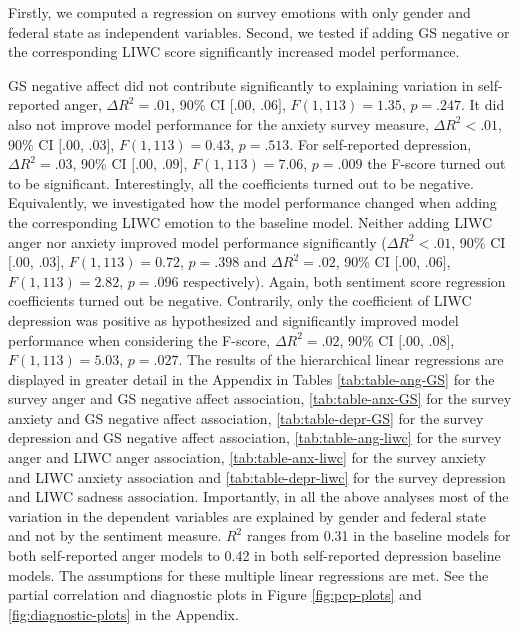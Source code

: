 \documentclass[
  english,
  jou,floatsintext]{apa7}
\begin{document}
Firstly, we computed a regression on survey emotions with only gender and federal state as independent variables. Second, we tested if adding GS negative or the corresponding LIWC score significantly increased model performance.

GS negative affect did not contribute significantly to explaining variation in self-reported anger, \(\Delta R^2 = .01\), 90\% CI \([.00\), \(.06]\), \(F(1, 113) = 1.35\), \(p = .247\). It did also not improve model performance for the anxiety survey measure, \(\Delta R^2 < .01\), 90\% CI \([.00\), \(.03]\), \(F(1, 113) = 0.43\), \(p = .513\). For self-reported depression, \(\Delta R^2 = .03\), 90\% CI \([.00\), \(.09]\), \(F(1, 113) = 7.06\), \(p = .009\) the F-score turned out to be significant. Interestingly, all the coefficients turned out to be negative.
Equivalently, we investigated how the model performance changed when adding the corresponding LIWC emotion to the baseline model. Neither adding LIWC anger nor anxiety improved model performance significantly (\(\Delta R^2 < .01\), 90\% CI \([.00\), \(.03]\), \(F(1, 113) = 0.72\), \(p = .398\) and \(\Delta R^2 = .02\), 90\% CI \([.00\), \(.06]\), \(F(1, 113) = 2.82\), \(p = .096\) respectively). Again, both sentiment score regression coefficients turned out be negative. Contrarily, only the coefficient of LIWC depression was positive as hypothesized and significantly improved model performance when considering the F-score, \(\Delta R^2 = .02\), 90\% CI \([.00\), \(.08]\), \(F(1, 113) = 5.03\), \(p = .027\).
The results of the hierarchical linear regressions are displayed in greater detail in the Appendix in Tables \ref{tab:table-ang-GS} for the survey anger and GS negative affect association, \ref{tab:table-anx-GS} for the survey anxiety and GS negative affect association, \ref{tab:table-depr-GS} for the survey depression and GS negative affect association, \ref{tab:table-ang-liwc} for the survey anger and LIWC anger association, \ref{tab:table-anx-liwc} for the survey anxiety and LIWC anxiety association and \ref{tab:table-depr-liwc} for the survey depression and LIWC sadness association.
Importantly, in all the above analyses most of the variation in the dependent variables are explained by gender and federal state and not by the sentiment measure. \(R^2\) ranges from 0.31 in the baseline models for both self-reported anger models to 0.42 in both self-reported depression baseline models.
The assumptions for these multiple linear regressions are met. See the partial correlation and diagnostic plots in Figure \ref{fig:pcp-plots} and \ref{fig:diagnostic-plots} in the Appendix.
\end{document}
